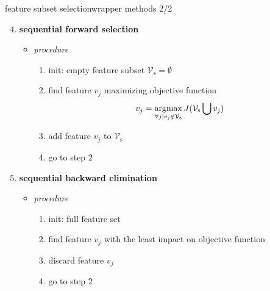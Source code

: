 		\begin{frame}{feature subset selection}{wrapper methods 2/2}
            \vspace{-2mm}
			\begin{enumerate}
                \setcounter{enumi}{3}
				\item	\textbf{sequential forward selection}
                    \begin{itemize}
                        \item   \textit{procedure}
                            \begin{enumerate}
                                \item	init: empty feature subset $\mathcal{V}_\mathrm{s} = {\emptyset}$
                                \item<1->	find feature $v_j$ maximizing objective function
                                            \begin{equation*}
                                                v_j = \operatorname*{argmax}_{\forall j | v_j \notin \mathcal{V}_\mathrm{s}} J({\mathcal{V}_\mathrm{s}} \bigcup v_j) 
                                            \end{equation*}
                                \item<1->	add feature $v_j$ to $\mathcal{V}_\mathrm{s}$ 
                                \item<1->	go to step $2$
                            \end{enumerate}
                    \end{itemize}
					
				\smallskip
                \item<2->	\textbf{sequential backward elimination}
                    \begin{itemize}
                        \item   \textit{procedure}
                            \begin{enumerate}
                                \item	init: full feature set
                                \item<2->	find feature $v_j$ with the least impact on objective function
                                \item<2->	discard feature $v_j$
                                \item<2->	go to step $2$
                            \end{enumerate}
                    \end{itemize}
			\end{enumerate}
		\end{frame}
        
